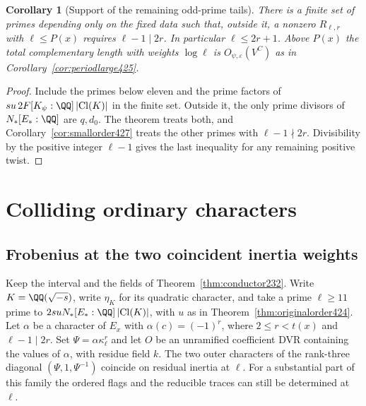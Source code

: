 \documentclass[a4paper,11pt]{article}
\newtheorem{corollary}[proposition]{Corollary}
\theoremstyle{definition}
\theoremstyle{remark}
\numberwithin{equation}{section}
\begin{document}
\begin{corollary}[Support of the remaining odd-prime tails]\leavevmode
\label{cor:unboundedprimes428}
There is a finite set of primes depending only on the fixed
data such that, outside it, a nonzero \(R_{\ell,r}\) with
\(\ell\le P(x)\) requires \(\ell-1\mid 2r\). In particular
\(\ell\le 2r+1\). Above \(P(x)\) the total complementary
length with weights \(\log\ell\) is \(O_{\psi,\varepsilon}(V^C)\)
as in Corollary~\ref{cor:periodlarge425}.
\end{corollary}
\begin{proof}
Include the primes below eleven and the prime factors of
\(su\,2F[K_\psi:\QQ]\,|\mathrm{Cl}(K)|\) in the finite set.
Outside it, the only prime divisors of \(N_*[E_*:\QQ]\)
are \(q,d_0\). The theorem treats both, and
Corollary~\ref{cor:smallorder427} treats the other primes
with \(\ell-1\nmid2r\). Divisibility by the positive integer
\(\ell-1\) gives the last inequality for any remaining
positive twist.
\end{proof}

\section{Colliding ordinary characters}\label{nav:chapter-coincident-characters}

\subsection{Frobenius at the two coincident inertia weights}
\label{sec:distinguishedfrobenius435}

Keep the interval and the fields of Theorem~\ref{thm:conductor232}.
Write \(K=\QQ(\sqrt{-s})\), write \(\eta_K\) for its quadratic
character, and take a prime \(\ell\ge 11\) prime to
\(2suN_*[E_*:\QQ]\,|\mathrm{Cl}(K)|\), with \(u\) as in
Theorem~\ref{thm:originalorder424}. Let \(\alpha\) be a character
of \(E_x\) with \(\alpha(c)=(-1)^r\), where
\(2\le r<t(x)\) and \(\ell-1\mid 2r\). Set
\(\Psi=\alpha\kappa_\ell^r\) and let \(O\) be an unramified
coefficient DVR containing the values of \(\alpha\), with residue
field \(k\). The two outer characters of the rank-three diagonal
\((\Psi,1,\Psi^{-1})\) coincide on residual inertia at \(\ell\).
For a substantial part of this family the ordered flags and the
reducible traces can still be determined at \(\ell\).
\end{document}

